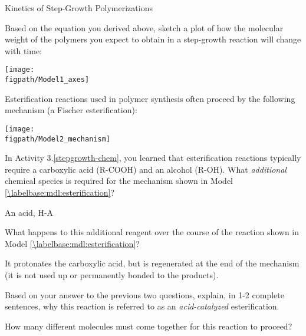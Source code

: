 \begin{activity}{Kinetics of Step-Growth Polymerizations}
\begin{ctqs}
\begin{enumerate}
		\end{enumerate}
	
	\question Based on the equation you derived above, sketch a plot of how the molecular weight of the polymers you expect to obtain in a step-growth reaction will change with time:
	
		\centerline{\texttt{[image: \\figpath/Model1\_axes]}}

\end{ctqs}
	

\begin{model}
\label{\labelbase:mdl:esterification}

	Esterification reactions used in polymer synthesis often proceed by the following mechanism (a Fischer esterification):
	
	\centerline{\texttt{[image: \\figpath/Model2\_mechanism]}}

\end{model}

\begin{ctqs}

		\question In Activity 3.\ref{stepgrowth-chem}, you learned that esterification reactions typically require a carboxylic acid (R-COOH) and an alcohol (R-OH).  What \emph{additional} chemical species is required for the mechanism shown in Model \ref{\labelbase:mdl:esterification}?
		
			\begin{solution}[0.5in]
				An acid, H-A
			\end{solution}
		
		\question What happens to this additional reagent over the course of the reaction shown in Model \ref{\labelbase:mdl:esterification}?
		
			\begin{solution}[1.25in]
				It protonates the carboxylic acid, but is regenerated at the end of the mechanism (it is not used up or permanently bonded to the products).
			\end{solution}
		
		\question Based on your answer to the previous two questions, explain, in 1-2 complete sentences, why this reaction is referred to as an \emph{acid-catalyzed} esterification.
		
			\begin{solution}[1.75in]
			\end{solution}
			
		\question How many different molecules must come together for this reaction to proceed?
		

\end{ctqs}
\end{activity}
